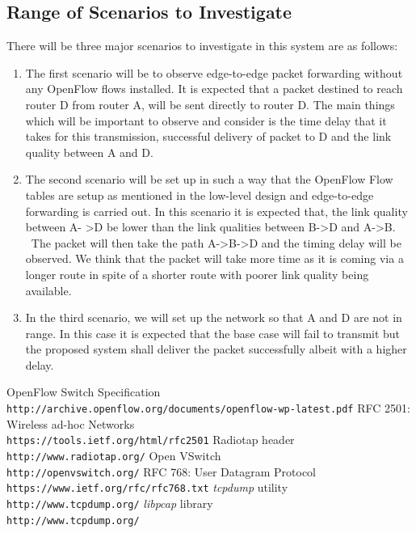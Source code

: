 \documentclass{article}
\begin{document}
\subsection{Range of Scenarios to Investigate}
There will be three major scenarios to investigate in this system are as follows:
\begin{enumerate}
\item The first scenario will be to observe edge-to-edge packet forwarding without any OpenFlow flows installed. It is
expected that a packet destined to reach router D from router A, will be sent directly to router D. The main things
which will be important to observe and consider is the time delay that it takes for this transmission, successful
delivery of packet to D and the link quality between A and D. 
\item The second scenario will be set up in such a way that the OpenFlow Flow tables are setup as mentioned in the
low-level design and edge-to-edge forwarding is carried out. In this scenario it is expected that, the link quality
between A- \textgreater D be lower than the link qualities between B-\textgreater D and A-\textgreater B.  The packet
will then take the path A-\textgreater B-\textgreater D and the
timing delay will be observed. We think that the packet will take more time as it is coming via a longer route in spite
of a shorter route with poorer link quality being available.
\item In the third scenario, we will set up the network so that A and D are not in range. In this case it is expected
that the base case will fail to transmit but the proposed system shall deliver the packet successfully albeit with a
higher delay.  
\end{enumerate}
\begin{thebibliography}{5}
OpenFlow Switch Specification
\\\texttt{http://archive.openflow.org/documents/openflow-wp-latest.pdf}
RFC 2501: Wireless ad-hoc Networks
\\\texttt{https://tools.ietf.org/html/rfc2501}
Radiotap header
\\\texttt{http://www.radiotap.org/}
\bibitem{}
Open VSwitch
\\\texttt{http://openvswitch.org/}
\bibitem{}
RFC 768: User Datagram Protocol
\\\texttt{https://www.ietf.org/rfc/rfc768.txt}
\bibitem{}
\textit{tcpdump} utility
\\\texttt{http://www.tcpdump.org/}
\bibitem{}
\textit{libpcap} library
\\\texttt{http://www.tcpdump.org/}
\end{thebibliography}
\end{document}
